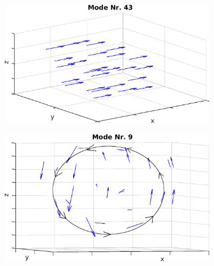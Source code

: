 \begin{figure}[!t]
\begin{subfigure}[t]{0.325\textwidth}
          \end{subfigure}
          \begin{subfigure}[t]{0.325\textwidth}
            \centering
            \includegraphics[width=\textwidth,height=0.8\textwidth]{figs/auswertung/manipulation/erstensungestModeNr43.png}
          \end{subfigure}
          \begin{subfigure}[t]{0.325\textwidth}
            \centering
            \includegraphics[width=\textwidth,height=0.8\textwidth]{figs/auswertung/manipulation/erstensungestModeNr9.png}
          \end{subfigure}

\end{figure}
